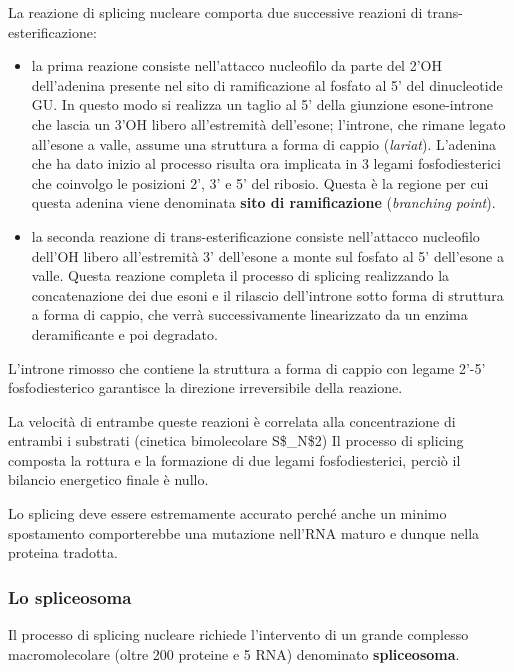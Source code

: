 \documentclass[]{article}
\begin{document}
La reazione di splicing nucleare comporta due successive reazioni di
trans-esterificazione:

\begin{itemize}
\itemsep1pt\parskip0pt
\item
  la prima reazione consiste nell'attacco nucleofilo da parte del 2'OH
  dell'adenina presente nel sito di ramificazione al fosfato al 5' del
  dinucleotide GU. In questo modo si realizza un taglio al 5' della
  giunzione esone-introne che lascia un 3'OH libero all'estremità
  dell'esone; l'introne, che rimane legato all'esone a valle, assume una
  struttura a forma di cappio (\emph{lariat}). L'adenina che ha dato
  inizio al processo risulta ora implicata in 3 legami fosfodiesterici
  che coinvolgo le posizioni 2', 3' e 5' del ribosio. Questa è la
  regione per cui questa adenina viene denominata \textbf{sito di
  ramificazione} (\emph{branching point}).
\item
  la seconda reazione di trans-esterificazione consiste nell'attacco
  nucleofilo dell'OH libero all'estremità 3' dell'esone a monte sul
  fosfato al 5' dell'esone a valle. Questa reazione completa il processo
  di splicing realizzando la concatenazione dei due esoni e il rilascio
  dell'introne sotto forma di struttura a forma di cappio, che verrà
  successivamente linearizzato da un enzima deramificante e poi
  degradato.
\end{itemize}

L'introne rimosso che contiene la struttura a forma di cappio con legame
2'-5' fosfodiesterico garantisce la direzione irreversibile della
reazione.

La velocità di entrambe queste reazioni è correlata alla concentrazione
di entrambi i substrati (cinetica bimolecolare S\$\_N\$2) Il processo di
splicing composta la rottura e la formazione di due legami
fosfodiesterici, perciò il bilancio energetico finale è nullo.

Lo splicing deve essere estremamente accurato perché anche un minimo
spostamento comporterebbe una mutazione nell'RNA maturo e dunque nella
proteina tradotta.

\subsubsection{Lo spliceosoma}\label{lo-spliceosoma}

Il processo di splicing nucleare richiede l'intervento di un grande
complesso macromolecolare (oltre 200 proteine e 5 RNA) denominato
\textbf{spliceosoma}.
\end{document}
